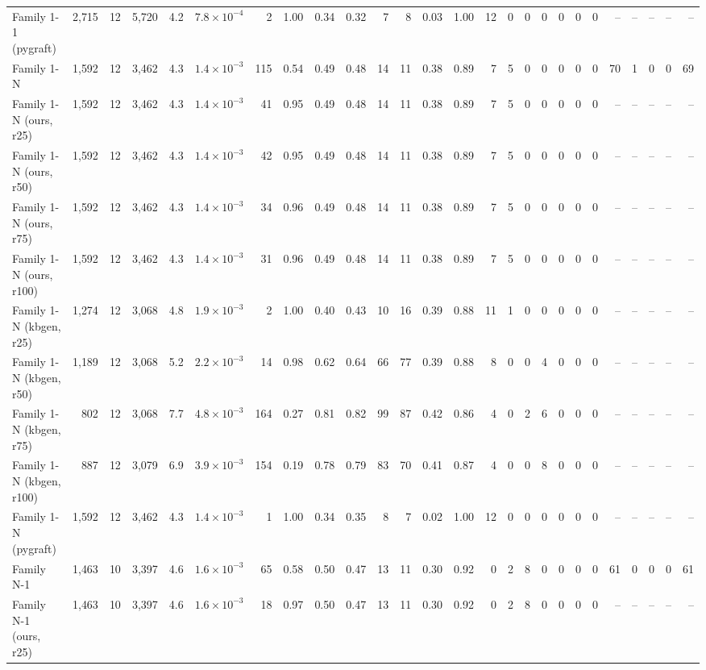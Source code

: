 \begin{tabular}{lrrrrrrrrrrrrrrrrrrrrrrrrr}
Family 1-1 (pygraft) & 2{,}715 & 12 & 5{,}720 & 4.2 & $7.8\times10^{-4}$ & 2 & 1.00 & 0.34 & 0.32 & 7 & 8 & 0.03 & 1.00 & 12 & 0 & 0 & 0 & 0 & 0 & 0 & – & – & – & – & – \\
Family 1-N & 1{,}592 & 12 & 3{,}462 & 4.3 & $1.4\times10^{-3}$ & 115 & 0.54 & 0.49 & 0.48 & 14 & 11 & 0.38 & 0.89 & 7 & 5 & 0 & 0 & 0 & 0 & 0 & 70 & 1 & 0 & 0 & 69 \\
Family 1-N (ours, r25) & 1{,}592 & 12 & 3{,}462 & 4.3 & $1.4\times10^{-3}$ & 41 & 0.95 & 0.49 & 0.48 & 14 & 11 & 0.38 & 0.89 & 7 & 5 & 0 & 0 & 0 & 0 & 0 & – & – & – & – & – \\
Family 1-N (ours, r50) & 1{,}592 & 12 & 3{,}462 & 4.3 & $1.4\times10^{-3}$ & 42 & 0.95 & 0.49 & 0.48 & 14 & 11 & 0.38 & 0.89 & 7 & 5 & 0 & 0 & 0 & 0 & 0 & – & – & – & – & – \\
Family 1-N (ours, r75) & 1{,}592 & 12 & 3{,}462 & 4.3 & $1.4\times10^{-3}$ & 34 & 0.96 & 0.49 & 0.48 & 14 & 11 & 0.38 & 0.89 & 7 & 5 & 0 & 0 & 0 & 0 & 0 & – & – & – & – & – \\
Family 1-N (ours, r100) & 1{,}592 & 12 & 3{,}462 & 4.3 & $1.4\times10^{-3}$ & 31 & 0.96 & 0.49 & 0.48 & 14 & 11 & 0.38 & 0.89 & 7 & 5 & 0 & 0 & 0 & 0 & 0 & – & – & – & – & – \\
Family 1-N (kbgen, r25) & 1{,}274 & 12 & 3{,}068 & 4.8 & $1.9\times10^{-3}$ & 2 & 1.00 & 0.40 & 0.43 & 10 & 16 & 0.39 & 0.88 & 11 & 1 & 0 & 0 & 0 & 0 & 0 & – & – & – & – & – \\
Family 1-N (kbgen, r50) & 1{,}189 & 12 & 3{,}068 & 5.2 & $2.2\times10^{-3}$ & 14 & 0.98 & 0.62 & 0.64 & 66 & 77 & 0.39 & 0.88 & 8 & 0 & 0 & 4 & 0 & 0 & 0 & – & – & – & – & – \\
Family 1-N (kbgen, r75) & 802 & 12 & 3{,}068 & 7.7 & $4.8\times10^{-3}$ & 164 & 0.27 & 0.81 & 0.82 & 99 & 87 & 0.42 & 0.86 & 4 & 0 & 2 & 6 & 0 & 0 & 0 & – & – & – & – & – \\
Family 1-N (kbgen, r100) & 887 & 12 & 3{,}079 & 6.9 & $3.9\times10^{-3}$ & 154 & 0.19 & 0.78 & 0.79 & 83 & 70 & 0.41 & 0.87 & 4 & 0 & 0 & 8 & 0 & 0 & 0 & – & – & – & – & – \\
Family 1-N (pygraft) & 1{,}592 & 12 & 3{,}462 & 4.3 & $1.4\times10^{-3}$ & 1 & 1.00 & 0.34 & 0.35 & 8 & 7 & 0.02 & 1.00 & 12 & 0 & 0 & 0 & 0 & 0 & 0 & – & – & – & – & – \\
Family N-1 & 1{,}463 & 10 & 3{,}397 & 4.6 & $1.6\times10^{-3}$ & 65 & 0.58 & 0.50 & 0.47 & 13 & 11 & 0.30 & 0.92 & 0 & 2 & 8 & 0 & 0 & 0 & 0 & 61 & 0 & 0 & 0 & 61 \\
Family N-1 (ours, r25) & 1{,}463 & 10 & 3{,}397 & 4.6 & $1.6\times10^{-3}$ & 18 & 0.97 & 0.50 & 0.47 & 13 & 11 & 0.30 & 0.92 & 0 & 2 & 8 & 0 & 0 & 0 & 0 & – & – & – & – & – \\

\end{tabular}
